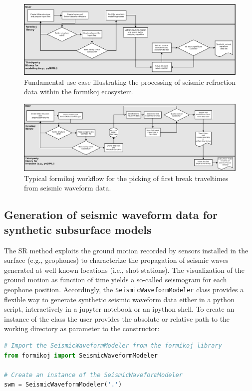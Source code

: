 \documentclass[a4paper,fleqn]{cas-sc}
\begin{document}
\begin{figure}
	\centering
	\includegraphics[width=.75\textwidth]{figures/workflow_modeling-crop.pdf}
	\caption{Fundamental use case illustrating the processing of seismic refraction data within the formikoj ecosystem.}
	\label{fig:modworkflow}
\end{figure}

\begin{figure}
	\centering
	\includegraphics[width=.75\textwidth]{figures/workflow_processing-crop.pdf}
	\caption{Typical formikoj workflow for the picking of first break traveltimes from seismic waveform data.}
	\label{fig:procworkflow}
\end{figure}


\subsection{Generation of seismic waveform data for synthetic subsurface models}

The SR method exploits the ground motion recorded by sensors installed in the surface (e.g., geophones) to characterize the propagation of seismic waves generated at well known locations (i.e., shot stations). 
The visualization of the ground motion as function of time yields a so-called seismogram for each geophone position.
Accordingly, the \texttt{SeismicWaveformModeler} class provides a flexible way to generate synthetic seismic waveform data either in a python script, interactively in a jupyter notebook or an ipython shell.
To create an instance of the class the user provides the absolute or relative path to the working directory as parameter to the constructor:
\begin{lstlisting}[language=Python]
# Import the SeismicWaveformModeler from the formikoj library
from formikoj import SeismicWaveformModeler

# Create an instance of the SeismicWaveformModeler
swm = SeismicWaveformModeler('.')

\end{lstlisting}
\end{document}
